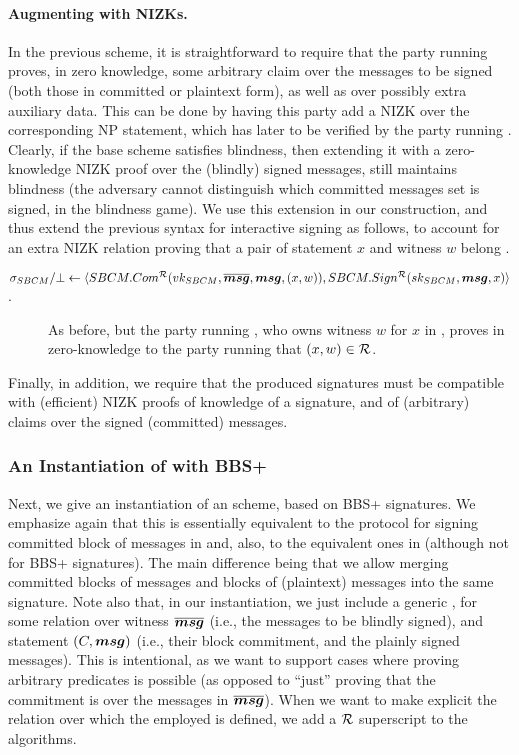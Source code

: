 \paragraph{Augmenting with NIZKs.} %
In the previous \SBCM scheme, it is straightforward to require that the party
running \SBCMCom proves, in zero knowledge, some arbitrary claim over the
messages to be signed (both those in committed or plaintext form), as well as
over possibly extra auxiliary data. This can be done by having this party add a
NIZK over the corresponding NP statement, which has later to be verified by the
party running \SBCMSign.
%
Clearly, if the base \SBCM scheme satisfies blindness, then extending it with a
zero-knowledge NIZK proof over the (blindly) signed messages, still maintains
blindness (the adversary cannot distinguish which committed messages set is
signed, in the blindness game).
%
We use this extension in our \CUASGen construction, and thus extend the previous
syntax for interactive signing  as follows, to account for an extra NIZK
relation \NIZKRel proving that a pair of statement $x$ and witness $w$ belong
\NIZKRel.

\begin{description}
\item[$\sigma_{SBCM}/\bot \gets \langle SBCM.Com^{\mathcal{R}}(vk_{SBCM},\overline{\boldsymbol{msg}},
  \boldsymbol{msg},(x,w)),SBCM.Sign^{\mathcal{R}}(sk_{SBCM},\boldsymbol{msg},x) \rangle$.] As before, but
  the party running \SBCMCom, who owns witness $w$ for $x$ in \NIZKRel, proves
  in zero-knowledge to the party running \SBCMSign that $(x,w) \in \mathcal{R}$.
\end{description}

Finally, in addition, we require that the produced signatures must be compatible
with (efficient) NIZK proofs of knowledge of a signature, and of (arbitrary)
claims over the signed (committed) messages.

\subsubsection{An Instantiation of \SBCM with BBS+}

Next, we give an instantiation of an \SBCM scheme, based on BBS+ signatures.
We emphasize again that this is essentially equivalent to the protocol for
signing committed block of messages in \cite{asm06} and, also, to the equivalent
ones in \cite{cl02,ps16} (although not for BBS+ signatures). The main difference
being that we allow merging committed blocks of messages and blocks of
(plaintext) messages into the same signature.
%
Note also that, in our instantiation, we just include a generic \NIZK, for some
relation over witness $\overline{\boldsymbol{msg}}$ (i.e., the messages to be blindly
signed), and statement $(C,\boldsymbol{msg})$ (i.e., their block commitment, and the
plainly signed messages). This is intentional, as we want to support cases where
proving arbitrary predicates is possible (as opposed to ``just'' proving that
the commitment is over the messages in $\overline{\boldsymbol{msg}}$).
%
When we want to make explicit the relation over which the employed \NIZK is
defined, we add a $\mathcal{R}$ superscript to the algorithms.

